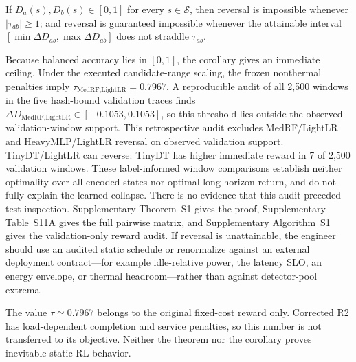 \begin{corollary}\label{cor:bound}
If $D_a(s),D_b(s)\in[0,1]$ for every $s\in\mathcal S$, then reversal is impossible whenever $|\tau_{ab}|\ge 1$; and reversal is guaranteed impossible whenever the attainable interval $[\min\Delta D_{ab},\max\Delta D_{ab}]$ does not straddle $\tau_{ab}$.
\end{corollary}

Because balanced accuracy lies in $[0,1]$, the corollary gives an immediate ceiling. Under the executed candidate-range scaling, the frozen nonthermal penalties imply $\tau_{\text{MedRF},\text{LightLR}}=0.7967$. A reproducible audit of all 2{,}500 windows in the five hash-bound validation traces finds $\Delta D_{\text{MedRF},\text{LightLR}}\in[-0.1053,0.1053]$, so this threshold lies outside the observed validation-window support. This retrospective audit excludes MedRF/LightLR and HeavyMLP/LightLR reversal on observed validation support. TinyDT/LightLR can reverse: TinyDT has higher immediate reward in 7 of 2{,}500 validation windows. These label-informed window comparisons establish neither optimality over all encoded states nor optimal long-horizon return, and do not fully explain the learned collapse. There is no evidence that this audit preceded test inspection. Supplementary Theorem~S1 gives the proof, Supplementary Table~S11A gives the full pairwise matrix, and Supplementary Algorithm~S1 gives the validation-only reward audit. If reversal is unattainable, the engineer should use an audited static schedule or renormalize against an external deployment contract---for example idle-relative power, the latency SLO, an energy envelope, or thermal headroom---rather than against detector-pool extrema.

The value $\tau\simeq0.7967$ belongs to the original fixed-cost reward only. Corrected R2 has load-dependent completion and service penalties, so this number is not transferred to its objective. Neither the theorem nor the corollary proves inevitable static RL behavior.

